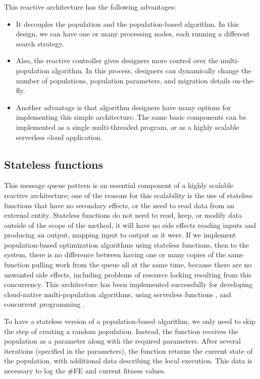 This reactive architecture has the following advantages:
\begin{itemize}

\item It decouples the population and the population-based algorithm. In this
design, we can have one or many processing nodes, each running a different
search strategy.

\item Also, the reactive controller gives designers more control over the
multi-population algorithm. In this process, designers can dynamically change
the number of populations, population parameters, and migration details
on-the-fly.

\item Another advantage is that algorithm designers have many options for
implementing this simple architecture. The same basic components can be
implemented as a single multi-threaded program, or as a highly scalable
serverless cloud application.
\end{itemize}

\subsection{Stateless functions} 
\label{functions} 

This message queue pattern is an essential component of a highly scalable
reactive architecture; one of the reasons for this scalability is the use of
stateless functions that have no secondary effects, or the need to read data
from an external entity. Stateless functions do not need to read, keep, or
modify data outside of the scope of the method, it will have no side
effects reading inputs and producing an output, mapping input to output
as it were. If we implement population-based
optimization algorithms using stateless functions, then to the system, there is
no difference between having one or many copies of the same function pulling
work from the queue all at the same time, because there are no unwanted side
effects, including problems of resource locking resulting from this
concurrency. This architecture has been implemented successfully for 
developing cloud-native multi-population algorithms,
using serverless functions \cite{garcia2018modern}, and concurrent programming \cite{guervos2019improving}.  

To have a stateless version of a population-based algorithm, we only need to
skip the step of creating a random population. Instead, the function receives
the population as a parameter along with the required parameters. After several
iterations (specified in the parameters), the function returns the current state
of the population, with additional data describing the local execution. This
data is necessary to log the \#FE and current fitness values.


